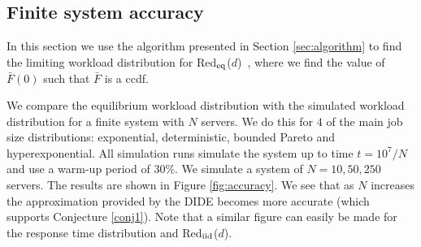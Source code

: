\documentclass[12pt]{report}
\newcommand{\Redid}{Red$_{\textup{eq}}$($d$)}
\newcommand{\Redind}{Red$_{\textup{iid}}$($d$)}
\begin{document}
\subsection{Finite system accuracy}
In this section we use the algorithm presented in Section \ref{sec:algorithm} to find the limiting workload distribution for \Redid\ , where we find the value of $\bar F(0)$ such that $\bar F$ is a ccdf.

We compare the equilibrium workload distribution with the simulated workload distribution for a finite system with $N$ servers. We do this for $4$ of the main job size distributions: exponential, deterministic, bounded Pareto and hyperexponential. All simulation runs simulate the system up to time $t=10^7/N$ and use a warm-up period of $30\%$. We simulate a system of $N=10,50,250$ servers. The results are shown in Figure \ref{fig:accuracy}. We see that as $N$ increases the approximation provided by the DIDE becomes more accurate (which supports Conjecture \ref{conj1}). Note that a similar figure can easily be made for the response time distribution and \Redind .
\end{document}

